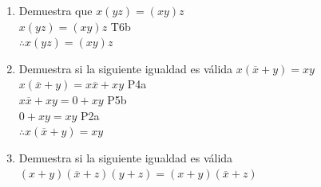 \documentclass[a4paper,12pt]{article}
\begin{document}
\begin{enumerate}[label=\textcolor{teal}{\textbf{\arabic*.}}]
    \item Demuestra que $x(yz)=(xy)z$ \\
    
        $x(yz)=(xy)z$ T6b\\ 
        $\therefore x(yz)=(xy)z$  \\
    \item Demuestra si la siguiente igualdad es válida $x(\overline{x}+y)=xy$\\
     
    $x(\overline{x}+y)=x\overline{x}+xy$ \hspace{1cm} P4a\\
    \hfill{$x\overline{x}+xy$}$=0+xy$ \hspace{1.5cm} P5b\\
    \hfill{$0+xy$}$=xy$  \hspace{2.5cm} P2a \\ 
    $\therefore x(\overline{x}+y)=xy$\\


    \item  Demuestra si la siguiente igualdad es válida $(x+y)(\overline{x}+z)(y+z)=(x+y)(\overline{x}+z)$\\
    

\end{enumerate}
\end{document}
